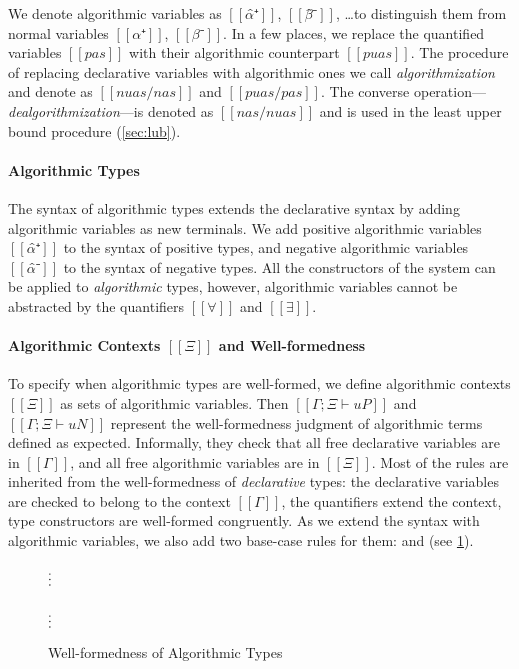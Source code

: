 We denote algorithmic variables as $[[α̂⁺]]$, $[[β̂⁻]]$, \dots to distinguish
them from normal variables $[[α⁺]]$, $[[β⁻]]$. In a few places, we replace the
quantified variables $[[pas]]$ with their algorithmic counterpart $[[puas]]$.
The procedure of replacing declarative variables with algorithmic ones we call
\emph{algorithmization} and denote as $[[ nuas/nas ]]$ and $[[ puas/pas ]]$. The
converse operation---\emph{dealgorithmization}---is denoted as $[[ nas/nuas ]]$ and 
is used in the least upper bound procedure (\cref{sec:lub}).

\paragraph{Algorithmic Types}
The syntax of algorithmic types extends the declarative syntax by adding
algorithmic variables as new terminals. We add positive algorithmic variables $[[α̂⁺]]$ 
to the syntax of positive types, and negative algorithmic variables $[[α̂⁻]]$ to the 
syntax of negative types. All the constructors of the system can be applied 
to \emph{algorithmic} types, however, algorithmic variables cannot be abstracted by the
quantifiers $[[∀]]$ and $[[∃]]$.

\paragraph{Algorithmic Contexts $[[Ξ]]$ and Well-formedness}
To specify when algorithmic types are well-formed, we define algorithmic
contexts $[[Ξ]]$ as sets of algorithmic variables. Then
$[[Γ ; Ξ ⊢ uP]]$ and $[[Γ ; Ξ ⊢ uN]]$ represent the well-formedness judgment of
algorithmic terms defined as expected. Informally, they check that all free
declarative variables are in $[[Γ]]$, and all free algorithmic variables are in
$[[Ξ]]$. Most of the rules are inherited from the well-formedness of
\emph{declarative} types: the declarative variables are checked to belong to the
context $[[Γ]]$, the quantifiers extend the context, type constructors are
well-formed congruently. As we extend the syntax with algorithmic variables, we
also add two base-case rules for them:  and
 (see \cref{fig:algo-wf}).

\begin{figure}
\begin{multicols}{2}
  $\vcenter{\hbox{\vdots}}$\\
  \ottusedrule{\ottdruleWFATPUVarLabeled{}}
  \columnbreak\\
  $\vcenter{\hbox{\vdots}}$\\
  \ottusedrule{\ottdruleWFATNUVarLabeled{}}
\end{multicols}
\caption{Well-formedness of Algorithmic Types}
\label{fig:algo-wf}
\end{figure}

